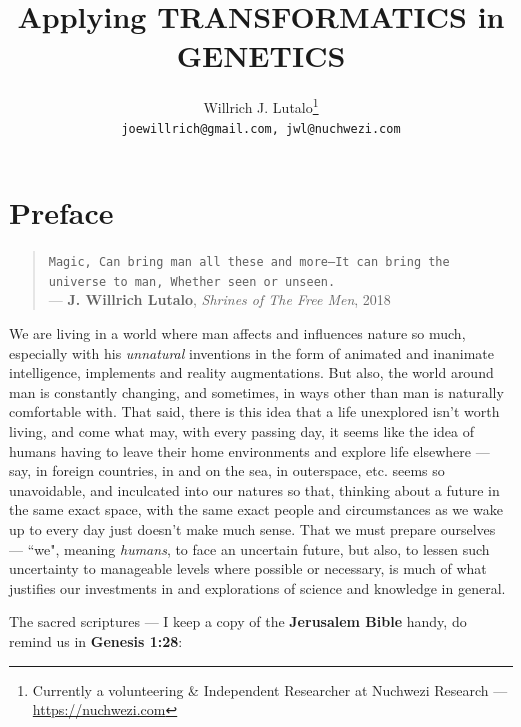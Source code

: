\documentclass[a4paper, 18pt]{book} %
\title{Applying \textbf{TRANSFORMATICS} in GENETICS}
\author{Willrich J. Lutalo\thanks{Currently a volunteering \& Independent Researcher at Nuchwezi Research --- \url{https://nuchwezi.com}}\\
\texttt{joewillrich@gmail.com, jwl@nuchwezi.com}}
\begin{document}



\frontmatter

\maketitle

\tableofcontents

\listoffigures

\listoftables

\newpage

\Large

\chapter{Preface}

\begin{quotation}
\noindent \texttt{Magic, Can bring man all these and more---It can bring the universe to man, Whether seen or unseen.}\\
\hspace*{\fill} --- \textbf{J. Willrich Lutalo}, \textit{Shrines of The Free Men}, 2018\cite{shrinesjwl}
\end{quotation}

We are living in a world where man affects and influences nature so much, especially with his \textit{unnatural} inventions in the form of animated and inanimate intelligence, implements and reality augmentations. But also, the world around man is constantly changing, and sometimes, in ways other than man is naturally comfortable with. That said, there is this idea that a life unexplored isn't worth living, and come what may, with every passing day, it seems like the idea of humans having to leave their home environments and explore life elsewhere --- say, in foreign countries, in and on the sea, in outerspace, etc. seems so unavoidable, and inculcated into our natures so that, thinking about a future in the same exact space, with the same exact people and circumstances as we wake up to every day just doesn't make much sense. That we must prepare ourselves --- ``we", meaning \textit{humans}, to face an uncertain future, but also, to lessen such uncertainty to manageable levels where possible or necessary, is much of what justifies our investments in and explorations of science and knowledge in general. 

The sacred scriptures --- I keep a copy of the \textbf{Jerusalem Bible} handy, do remind us in \textbf{Genesis 1:28}:
\end{document}
